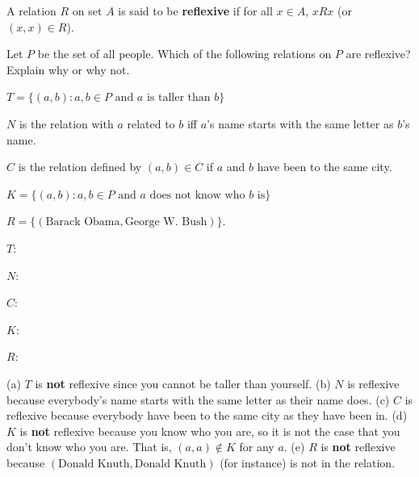 \begin{df}
A relation $R$ on set $A$ is said to be
{\bf reflexive} if 
for all $x\in A$,
$x R x$ (or $(x,x)\in R$).
\end{df}


\begin{exer}\label{exa:propsExa}
Let $P$ be the set of all people.  
Which of the following relations on $P$ are reflexive?  Explain why or why not.
\begin{lenum}
\item $T= \{(a,b) : a,b\in P \mbox{ and $a$ is taller than $b$}\}$
\item $N$ is the relation with $a$ related to $b$ iff $a$'s name starts with the same letter as $b$'s name.
\item $C$ is the relation defined by $(a,b)\in C$ if $a$ and $b$ have been to the same city.
\item $K = \{(a,b) : a,b\in P \mbox{ and $a$ does not know who $b$ is}\}$
\item $R = \{(\mbox{Barack Obama}, \mbox{George W. Bush})\}$.
\end{lenum}
\begin{lenum}
\item $T$: \blanklinefill  

\blanklinefill
\item $N$: \blanklinefill 

\blanklinefill
\item $C$: \blanklinefill

\blanklinefill
\item $K$: \blanklinefill

\blanklinefill
\item $R$: \blanklinefill

\blanklinefill
\end{lenum}
\begin{answer}
(a) $T$ is {\bf not} reflexive since you cannot be taller than yourself.
(b) $N$ is reflexive because everybody's name starts with the same letter as their name does.
(c) $C$ is reflexive because everybody have been to the same city as they have been in.
(d) $K$ is {\bf not} reflexive because you know who you are, 
so it is not the case that you don't know who you are.  That is, $(a,a)\not\in K$ for any $a$.
(e) $R$ is {\bf not} reflexive because $(\mbox{Donald Knuth}, \mbox{Donald Knuth})$ 
(for instance) is not in the relation.
\end{answer}
\end{exer}



